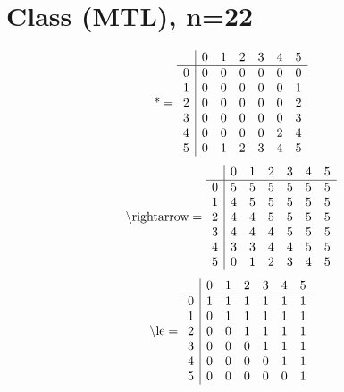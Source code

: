 \documentclass[11pt]{article}
\begin{document}
\section{Class (MTL), n=22}
\[\text{*} = 
\begin{array}{r | r r r r r r}
 & 0 & 1 & 2 & 3 & 4 & 5 \\ \hline
0 & 0 & 0 & 0 & 0 & 0 & 0 \\
1 & 0 & 0 & 0 & 0 & 0 & 1 \\
2 & 0 & 0 & 0 & 0 & 0 & 2 \\
3 & 0 & 0 & 0 & 0 & 0 & 3 \\
4 & 0 & 0 & 0 & 0 & 2 & 4 \\
5 & 0 & 1 & 2 & 3 & 4 & 5 \\
\end{array}
\]
\[\text{\textbackslash rightarrow} = 
\begin{array}{r | r r r r r r}
 & 0 & 1 & 2 & 3 & 4 & 5 \\ \hline
0 & 5 & 5 & 5 & 5 & 5 & 5 \\
1 & 4 & 5 & 5 & 5 & 5 & 5 \\
2 & 4 & 4 & 5 & 5 & 5 & 5 \\
3 & 4 & 4 & 4 & 5 & 5 & 5 \\
4 & 3 & 3 & 4 & 4 & 5 & 5 \\
5 & 0 & 1 & 2 & 3 & 4 & 5 \\
\end{array}
\]
\[\text{\textbackslash le} = 
\begin{array}{r | r r r r r r}
 & 0 & 1 & 2 & 3 & 4 & 5 \\ \hline
0 & 1 & 1 & 1 & 1 & 1 & 1 \\
1 & 0 & 1 & 1 & 1 & 1 & 1 \\
2 & 0 & 0 & 1 & 1 & 1 & 1 \\
3 & 0 & 0 & 0 & 1 & 1 & 1 \\
4 & 0 & 0 & 0 & 0 & 1 & 1 \\
5 & 0 & 0 & 0 & 0 & 0 & 1 \\
\end{array}
\]
\end{document}
